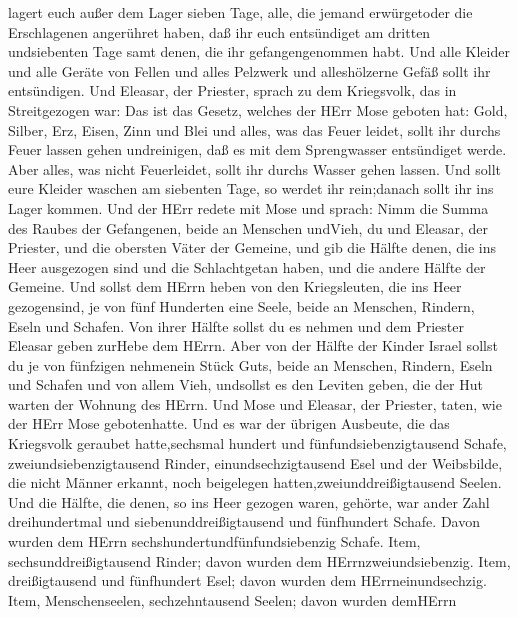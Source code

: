 lagert euch außer dem Lager sieben Tage, alle, die jemand erwürgetoder
die Erschlagenen angerühret haben, daß ihr euch entsündiget am dritten
undsiebenten Tage samt denen, die ihr gefangengenommen habt.
 Und alle Kleider und alle Geräte von Fellen und alles
Pelzwerk und alleshölzerne Gefäß sollt ihr entsündigen. 
Und Eleasar, der Priester, sprach zu dem Kriegsvolk, das in
Streitgezogen war: Das ist das Gesetz, welches der HErr Mose geboten
hat:  Gold, Silber, Erz, Eisen, Zinn und Blei 
und alles, was das Feuer leidet, sollt ihr durchs Feuer lassen gehen
undreinigen, daß es mit dem Sprengwasser entsündiget werde. Aber alles,
was nicht Feuerleidet, sollt ihr durchs Wasser gehen lassen.
 Und sollt eure Kleider waschen am siebenten Tage, so
werdet ihr rein;danach sollt ihr ins Lager kommen.  Und der
HErr redete mit Mose und sprach:  Nimm die Summa des Raubes
der Gefangenen, beide an Menschen undVieh, du und Eleasar, der Priester,
und die obersten Väter der Gemeine,  und gib die Hälfte
denen, die ins Heer ausgezogen sind und die Schlachtgetan haben, und die
andere Hälfte der Gemeine.  Und sollst dem HErrn heben von
den Kriegsleuten, die ins Heer gezogensind, je von fünf Hunderten eine
Seele, beide an Menschen, Rindern, Eseln und Schafen.  Von
ihrer Hälfte sollst du es nehmen und dem Priester Eleasar geben zurHebe
dem HErrn.  Aber von der Hälfte der Kinder Israel sollst du
je von fünfzigen nehmenein Stück Guts, beide an Menschen, Rindern, Eseln
und Schafen und von allem Vieh, undsollst es den Leviten geben, die der
Hut warten der Wohnung des HErrn.  Und Mose und Eleasar,
der Priester, taten, wie der HErr Mose gebotenhatte.  Und
es war der übrigen Ausbeute, die das Kriegsvolk geraubet hatte,sechsmal
hundert und fünfundsiebenzigtausend Schafe, 
zweiundsiebenzigtausend Rinder,  einundsechzigtausend Esel
 und der Weibsbilde, die nicht Männer erkannt, noch
beigelegen hatten,zweiunddreißigtausend Seelen.  Und die
Hälfte, die denen, so ins Heer gezogen waren, gehörte, war ander Zahl
dreihundertmal und siebenunddreißigtausend und fünfhundert Schafe.
 Davon wurden dem HErrn sechshundertundfünfundsiebenzig
Schafe.  Item, sechsunddreißigtausend Rinder; davon wurden
dem HErrnzweiundsiebenzig.  Item, dreißigtausend und
fünfhundert Esel; davon wurden dem HErrneinundsechzig. 
Item, Menschenseelen, sechzehntausend Seelen; davon wurden demHErrn
